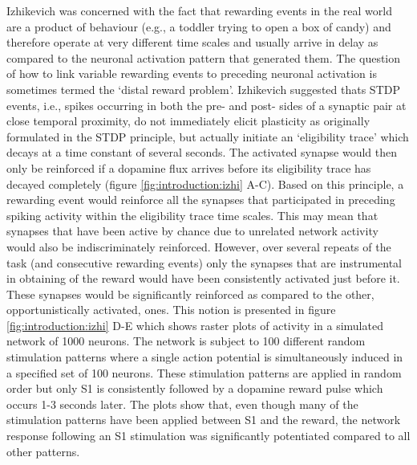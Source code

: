     Izhikevich was concerned with the fact that rewarding events in the real world are a product of behaviour (e.g., a toddler trying to open a box of candy) and  therefore operate at very different time scales and usually arrive in delay as compared to the neuronal activation pattern that generated them. The question of how to link variable rewarding events to preceding neuronal activation is sometimes termed the `distal reward problem'. Izhikevich suggested thats STDP events, i.e., spikes occurring in both the pre- and post- sides of a synaptic pair at close temporal proximity, do not immediately elicit plasticity as originally formulated in the STDP principle, but actually initiate an `eligibility trace' which decays at a time constant of several seconds. The activated synapse would then only be reinforced if a dopamine flux arrives before its eligibility trace has decayed completely (figure \ref{fig:introduction:izhi} A-C). Based on this principle, a rewarding event would reinforce all the synapses that participated in preceding spiking activity within the eligibility trace time scales. This may mean that synapses that have been active by chance due to unrelated network activity would also be indiscriminately reinforced. However, over several repeats of the task (and consecutive rewarding events) only the synapses that are instrumental in obtaining of the reward would have been consistently activated just before it. These synapses would be significantly reinforced as compared to the other, opportunistically activated, ones. This notion is presented in figure \ref{fig:introduction:izhi} D-E which shows raster plots of activity in a simulated network of 1000 neurons. The network is subject to 100 different random stimulation patterns where a single action potential is simultaneously induced in a specified set of 100 neurons. These stimulation patterns are applied in random order but only S\textsc{1} is consistently followed by a dopamine reward pulse which occurs 1-3 seconds later. The plots show that, even though many of the stimulation patterns have been applied between S\textsc{1} and the reward, the network response following an S\textsc{1} stimulation was significantly potentiated compared to all other patterns.

